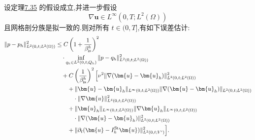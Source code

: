 \begin{theorem}
\label{thm:time-dependent-fem-pressure-error}
设定理\hyperref[thm:time-dependent-fem-velocity-error]{7.35} 的假设成立,并进一步假设
\begin{equation}\label{eq:time-dependent-fem-pressure-gradient-regularity}
  \nabla\bm{u}\in L^\infty(0,T;L^2(\Omega))
\end{equation}
且网格剖分族是拟一致的.则对所有 $t\in(0,T]$,有如下误差估计:
\begin{equation}\label{eq:time-dependent-fem-pressure-error}
\begin{aligned}
  \|p-p_h\|_{L^2(0,t;L^2(\Omega))}^2
  &\le C\left(1+\frac{1}{\beta_{\mathrm{is}}^h}\right)^2\\
  &\quad\cdot\inf_{q_h\in L^2(0,t;Q_h)}
       \|p-q_h\|_{L^2(0,t;L^2(\Omega))}^2\\
  &\quad+C\left(\frac{1}{\beta_{\mathrm{is}}^h}\right)^2
       \Bigl[
       \nu^2\|\nabla(\bm{u}-\bm{u}_h)\|_{L^2(0,t;L^2(\Omega))}^2\\
  &\qquad+\|\bm{u}-\bm{u}_h\|_{L^\infty(0,t;L^2(\Omega))}
       \|\nabla(\bm{u}-\bm{u}_h)\|_{L^2(0,t;L^2(\Omega))}\\
  &\qquad\quad\cdot\|\nabla\bm{u}\|_{L^4(0,t;L^2(\Omega))}^2\\
  &\qquad+\|\bm{u}_h\|_{L^\infty(0,t;L^2(\Omega))}
       \|\nabla\bm{u}_h\|_{L^\infty(0,t;L^2(\Omega))}\\
  &\qquad\quad\cdot\|\nabla(\bm{u}-\bm{u}_h)\|_{L^2(0,t;L^2(\Omega))}^2\\
  &\qquad+\|\partial_t(\bm{u}-I_h^{\mathrm{St}}\bm{u})\|_{L^2(0,t;V')}^2
       \Bigr].
\end{aligned}
\end{equation}
\end{theorem}

